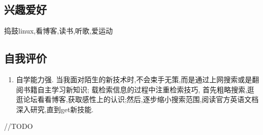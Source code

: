\documentclass{ctexart}
\begin{document}
\subsection{兴趣爱好}
\label{sec-1-6}
捣鼓linux,看博客,读书,听歌,爱运动
\subsection{自我评价}
\label{sec-1-7}
\begin{enumerate}
\item 自学能力强. 当我面对陌生的新技术时,不会束手无策,而是通过上网搜索或是翻阅书籍自主学习新知识;
载检索信息的过程中注重检索技巧, 首先粗略搜索,逛逛论坛看看博客,获取感性上的认识;然后,逐步缩小搜索范围,阅读官方英语文档深入研究,直到get新技能.
\end{enumerate}
//TODO
\end{document}
